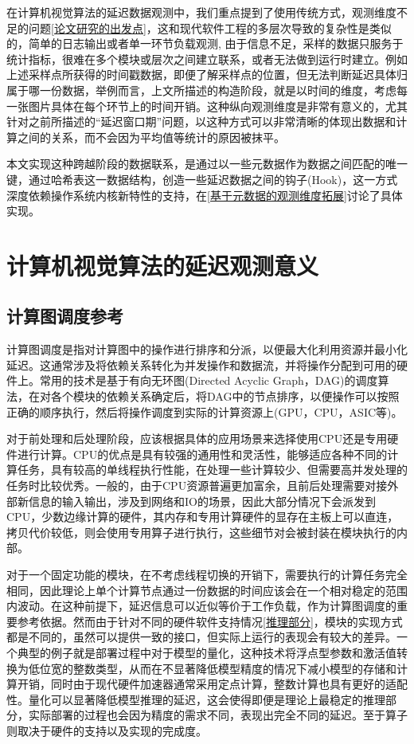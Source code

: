 \documentclass[master]{shtthesis}
\begin{document}
在计算机视觉算法的延迟数据观测中，我们重点提到了使用传统方式，观测维度不足的问题\ref{论文研究的出发点}，这和现代软件工程的多层次导致的复杂性是类似的，简单的日志输出或者单一环节负载观测, 由于信息不足，采样的数据只服务于统计指标，很难在多个模块或层次之间建立联系，或者无法做到运行时建立。例如上述采样点所获得的时间戳数据，即便了解采样点的位置，但无法判断延迟具体归属于哪一份数据，举例而言，上文所描述的构造阶段，就是以时间的维度，考虑每一张图片具体在每个环节上的时间开销。这种纵向观测维度是非常有意义的，尤其针对之前所描述的“延迟窗口期”问题，以这种方式可以非常清晰的体现出数据和计算之间的关系，而不会因为平均值等统计的原因被抹平。

本文实现这种跨越阶段的数据联系，是通过以一些元数据作为数据之间匹配的唯一键，通过哈希表这一数据结构，创造一些延迟数据之间的钩子(Hook)，这一方式深度依赖操作系统内核新特性的支持，在\ref{基于元数据的观测维度拓展}讨论了具体实现。

\section{计算机视觉算法的延迟观测意义}\label{计算机视觉算法的延迟观测意义}
\subsection{计算图调度参考}\label{计算图调度参考}
计算图调度是指对计算图中的操作进行排序和分派，以便最大化利用资源并最小化延迟。这通常涉及将依赖关系转化为并发操作和数据流，并将操作分配到可用的硬件上。常用的技术是基于有向无环图(Directed Acyclic Graph，DAG)的调度算法，在对各个模块的依赖关系确定后，将DAG中的节点排序，以便操作可以按照正确的顺序执行，然后将操作调度到实际的计算资源上(GPU，CPU，ASIC等)。

对于前处理和后处理阶段，应该根据具体的应用场景来选择使用CPU还是专用硬件进行计算。CPU的优点是具有较强的通用性和灵活性，能够适应各种不同的计算任务，具有较高的单线程执行性能，在处理一些计算较少、但需要高并发处理的任务时比较优秀。一般的，由于CPU资源普遍更加富余，且前后处理需要对接外部新信息的输入输出，涉及到网络和IO的场景，因此大部分情况下会派发到CPU，少数边缘计算的硬件，其内存和专用计算硬件的显存在主板上可以直连，拷贝代价较低，则会使用专用算子进行执行，这些细节对会被封装在模块执行的内部。

对于一个固定功能的模块，在不考虑线程切换的开销下，需要执行的计算任务完全相同，因此理论上单个计算节点通过一份数据的时间应该会在一个相对稳定的范围内波动。在这种前提下，延迟信息可以近似等价于工作负载，作为计算图调度的重要参考依据。然而由于针对不同的硬件软件支持情况\ref{推理部分}，模块的实现方式都是不同的，虽然可以提供一致的接口，但实际上运行的表现会有较大的差异。一个典型的例子就是部署过程中对于模型的量化，这种技术将浮点型参数和激活值转换为低位宽的整数类型，从而在不显著降低模型精度的情况下减小模型的存储和计算开销，同时由于现代硬件加速器通常采用定点计算，整数计算也具有更好的适配性。量化可以显著降低模型推理的延迟，这会使得即便是理论上最稳定的推理部分，实际部署的过程也会因为精度的需求不同，表现出完全不同的延迟。至于算子则取决于硬件的支持以及实现的完成度。
\end{document}
